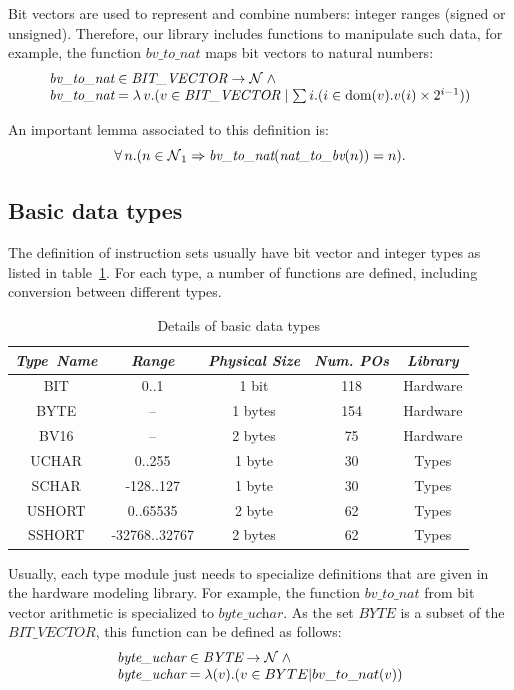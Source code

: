 \documentclass[a4paper]{llncs}
\begin{document}
Bit vectors are used to represent and combine numbers: integer ranges
(signed or unsigned). Therefore, our library includes functions to
manipulate such data, for example, the function $\textit{bv\_to\_nat}$
maps bit vectors to natural numbers:
$$
\begin{array}{l}
\textit{bv\_to\_nat} \in \textit{BIT\_VECTOR} \fun \nat  \land \\
\textit{bv\_to\_nat} = \lambda v .  (v \in \textit{BIT\_VECTOR} \mid  \sum i . (i \in \dom(v) . v(i)
\times 2^{i-1}))
\end{array}
$$

An important lemma associated to this definition is: 
$$\forall n . (n \in \nat_1 \implies \textit{bv\_to\_nat}(\textit{nat\_to\_bv}(n)) = n).$$



\subsection{Basic data types}

The definition of instruction sets usually have bit vector and integer
types as listed in table~\ref{tab:types}. For each type, a number of
functions are defined, including conversion between different types.

\begin{table}[h]
\caption{Details of basic data types}
\label{tab:types}
\begin{center}
\begin{tabular}{|c|c|c|c|c|}
\hline
 \textit{Type\ Name} & \textit{Range} & \textit{Physical Size}  & \textit{Num. POs} & \textit{Library} \\\hline
 BIT & 0..1 & 1 bit &   118 & Hardware \\\hline 
 BYTE & -- & 1 bytes &  154 & Hardware \\\hline
 BV16 & -- & 2 bytes &  75 & Hardware \\ \hline
 UCHAR & 0..255 & 1 byte &  30 & Types \\\hline
 SCHAR & -128..127 & 1 byte & 30 & Types \\\hline 
 USHORT & 0..65535 & 2 byte & 62 & Types \\\hline
 SSHORT & -32768..32767 & 2 bytes & 62 & Types \\\hline 
\end{tabular}
\end{center}
\end{table}

Usually, each type module just needs to specialize definitions that
are given in the hardware modeling library.  For example, the function
$\textit{bv\_to\_nat}$ from bit vector arithmetic is specialized to
$\textit{byte\_uchar}$. As the set $\textit{BYTE}$ is a subset of the
$\textit{BIT\_VECTOR}$, this function can be defined as follows:
$$
\begin{array}{l}
\textit{byte\_uchar} \in \textit{BYTE} \fun \nat \land \\
\textit{byte\_uchar} = \lambda (v) . ( v \in BYTE | bv\_to\_nat(v) )
\end{array}
$$
\end{document}
